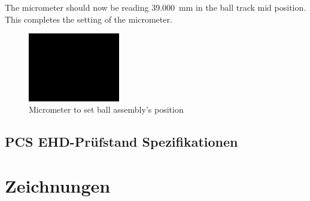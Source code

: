 \begin{appendices}
    The micrometer should now be reading \SI{39.000}{\mm} in the ball track mid position.
    This completes the setting of the micrometer.
    \begin{figure}[htb]
        \centering
        \includegraphics[width=4cm]{./images/blank_img.jpg}
        \caption{Micrometer to set ball assembly's position}
        \label{fig:micrometer_ball_assembly_position}
    \end{figure}


    \section{PCS EHD-Prüfstand Spezifikationen}
        

    \chapter{Zeichnungen}
\end{appendices}
